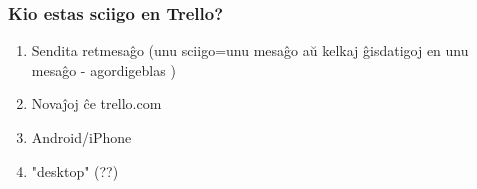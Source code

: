 \documentclass{beamer}
\begin{document}
  \begin{frame}
    \frametitle{Kio estas sciigo en Trello?}

	\begin{enumerate}
		\item Sendita retmesaĝo (unu sciigo=unu mesaĝo aŭ kelkaj ĝisdatigoj en unu mesaĝo - \alert{agordigeblas} )
		\item Novaĵoj ĉe trello.com
		\item Android/iPhone
		\item "desktop" (??)
	\end{enumerate}
  \end{frame}
\end{document}
